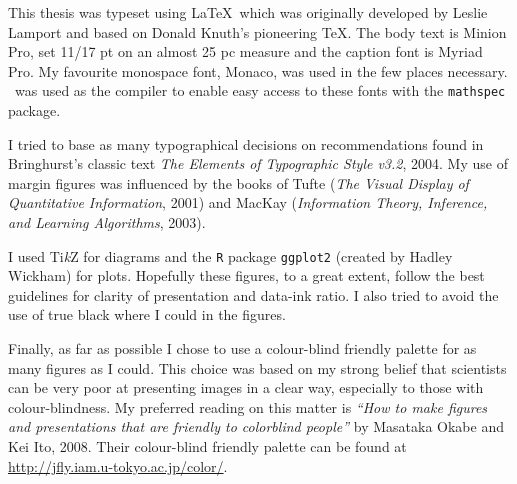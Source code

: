 This thesis was typeset using \LaTeX\ which was originally developed by Leslie Lamport and based on Donald Knuth's pioneering \TeX\@.
The body text is Minion Pro, set 11/17 pt on an almost 25 pc measure and the caption font is Myriad Pro.
My favourite monospace font, Monaco, was used in the few places necessary.
\XeLaTeX\ was used as the compiler to enable easy access to these fonts with the \texttt{mathspec} package.

I tried to base as many typographical decisions on recommendations found in Bringhurst's classic text \emph{The Elements of Typographic Style v3.2}, 2004.
My use of margin figures was influenced by the books of Tufte (\emph{The Visual Display of Quantitative Information}, 2001) and MacKay (\emph{Information Theory, Inference, and Learning Algorithms}, 2003).

I used Ti\textit{k}Z for diagrams and the \texttt{R} package \texttt{ggplot2} (created by Hadley Wickham) for plots.
Hopefully these figures, to a great extent, follow the best guidelines for clarity of presentation and data-ink ratio.
I also tried to avoid the use of true black where I could in the figures.

Finally, as far as possible I chose to use a colour-blind friendly palette for as many figures as I could.
This choice was based on my strong belief that scientists can be very poor at presenting images in a clear way, especially to those with colour-blindness.
My preferred reading on this matter is \emph{``How to make figures and presentations that are friendly to colorblind people''} by Masataka Okabe and Kei Ito, 2008.
Their colour-blind friendly palette can be found at \url{http://jfly.iam.u-tokyo.ac.jp/color/}.

